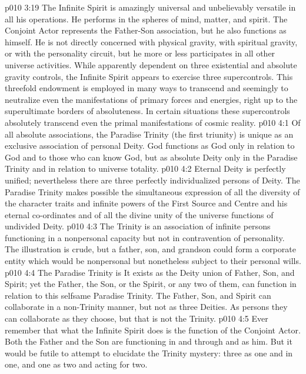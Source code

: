 \vs p010 3:19 \pc The Infinite Spirit is amazingly universal and unbelievably versatile in all his operations. He performs in the spheres of mind, matter, and spirit. The Conjoint Actor represents the Father\hyp{}Son association, but he also functions as himself. He is not directly concerned with physical gravity, with spiritual gravity, or with the personality circuit, but he more or less participates in all other universe activities. While apparently dependent on three existential and absolute gravity controls, the Infinite Spirit appears to exercise three supercontrols. This threefold endowment is employed in many ways to transcend and seemingly to neutralize even the manifestations of primary forces and energies, right up to the superultimate borders of absoluteness. In certain situations these supercontrols absolutely transcend even the primal manifestations of cosmic reality.
\vs p010 4:1 Of all absolute associations, the Paradise Trinity (the first triunity) is unique as an exclusive association of personal Deity. God functions as God only in relation to God and to those who can know God, but as absolute Deity only in the Paradise Trinity and in relation to universe totality.
\vs p010 4:2 \pc Eternal Deity is perfectly unified; nevertheless there are three perfectly individualized persons of Deity. The Paradise Trinity makes possible the simultaneous expression of all the diversity of the character traits and infinite powers of the First Source and Centre and his eternal co\hyp{}ordinates and of all the divine unity of the universe functions of undivided Deity.
\vs p010 4:3 The Trinity is an association of infinite persons functioning in a nonpersonal capacity but not in contravention of personality. The illustration is crude, but a father, son, and grandson could form a corporate entity which would be nonpersonal but nonetheless subject to their personal wills.
\vs p010 4:4 The Paradise Trinity is  It exists as the Deity union of Father, Son, and Spirit; yet the Father, the Son, or the Spirit, or any two of them, can function in relation to this selfsame Paradise Trinity. The Father, Son, and Spirit can collaborate in a non\hyp{}Trinity manner, but not as three Deities. As persons they can collaborate as they choose, but that is not the Trinity.
\vs p010 4:5 \pc Ever remember that what the Infinite Spirit does is the function of the Conjoint Actor. Both the Father and the Son are functioning in and through and as him. But it would be futile to attempt to elucidate the Trinity mystery: three as one and in one, and one as two and acting for two.
